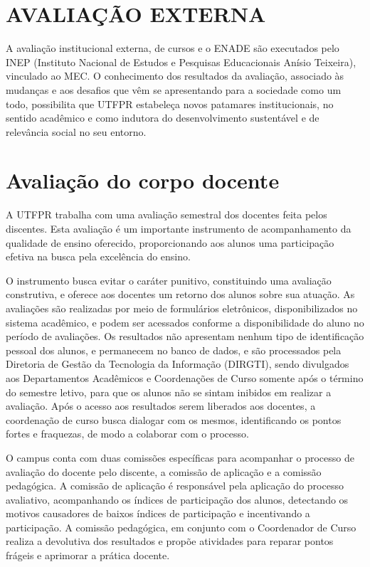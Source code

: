 \section{AVALIAÇÃO EXTERNA}

A avaliação institucional externa, de cursos e o ENADE são executados pelo INEP (Instituto Nacional de Estudos e Pesquisas Educacionais Anísio Teixeira), vinculado ao MEC. O conhecimento dos resultados da avaliação, associado às mudanças e aos desafios que vêm se apresentando para a sociedade como um todo, possibilita que UTFPR estabeleça novos patamares institucionais, no sentido acadêmico e como indutora do desenvolvimento sustentável e de relevância social no seu entorno.

\section{Avaliação do corpo docente}

A UTFPR trabalha com uma avaliação semestral dos docentes feita pelos discentes. Esta avaliação é um importante instrumento de acompanhamento da qualidade de ensino oferecido, proporcionando aos alunos uma participação efetiva na busca pela excelência do ensino.

O instrumento busca evitar o caráter punitivo, constituindo uma avaliação construtiva, e oferece aos docentes um retorno dos alunos sobre sua atuação. As avaliações são realizadas por meio de formulários eletrônicos, disponibilizados no sistema acadêmico, e podem ser acessados conforme a disponibilidade do aluno no período de avaliações. Os resultados não apresentam nenhum tipo de identificação pessoal dos alunos, e permanecem no banco de dados, e são processados pela Diretoria de Gestão da Tecnologia da Informação (DIRGTI), sendo divulgados aos Departamentos Acadêmicos e Coordenações de Curso somente após o término do semestre letivo, para que os alunos não se sintam inibidos em realizar a avaliação. Após o acesso aos resultados serem liberados aos docentes, a coordenação de curso busca dialogar com os mesmos, identificando os pontos fortes e fraquezas, de modo a colaborar com o processo.


O campus conta com duas comissões específicas para acompanhar o processo de avaliação do docente pelo discente, a comissão de aplicação e a comissão pedagógica. A comissão de aplicação é responsável pela aplicação do processo avaliativo, acompanhando os índices de participação dos alunos, detectando os motivos causadores de baixos índices de participação e incentivando a participação. A comissão pedagógica, em conjunto com o Coordenador de Curso realiza a devolutiva dos resultados e propõe atividades para reparar pontos frágeis e aprimorar a prática docente.

